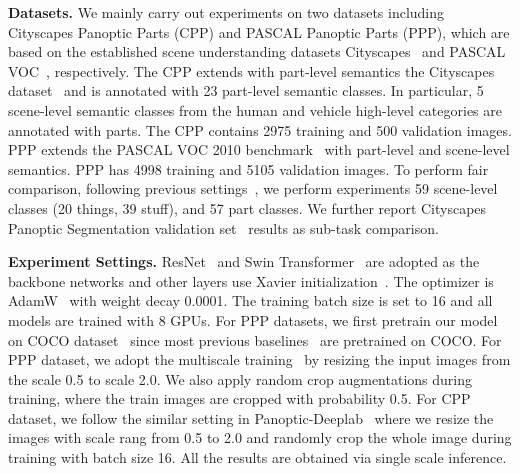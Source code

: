 \noindent
\textbf{Datasets.}
We mainly carry out experiments on two datasets including Cityscapes Panoptic Parts (CPP) and PASCAL Panoptic Parts (PPP), which are based on the established scene understanding datasets Cityscapes~\cite{cordts2016cityscapes} and PASCAL VOC~\cite{Everingham2010Pascal}, respectively. The CPP extends with part-level semantics the Cityscapes dataset~\cite{cordts2016cityscapes} and is annotated with 23 part-level semantic classes. In particular, 5 scene-level semantic classes from the {human} and {vehicle} high-level categories are annotated with parts. The CPP contains 2975 training and 500 validation images. PPP extends the PASCAL VOC 2010 benchmark~\cite{Everingham2010Pascal} with part-level and scene-level semantics. PPP has 4998 training and 5105 validation images. To perform fair comparison, following previous settings~\cite{degeus2021panopticparts,Everingham2010Pascal}, we perform experiments 59 scene-level classes (20 things, 39 stuff), and 57 part classes.  We further report Cityscapes Panoptic Segmentation validation set~\cite{cordts2016cityscapes} results as sub-task comparison.


\noindent
\textbf{Experiment Settings.} ResNet~\cite{resnet} and Swin Transformer~\cite{liu2021swin} are adopted as the backbone networks and other layers use Xavier initialization~\cite{xavier_init}. The optimizer is AdamW~\cite{ADAMW} with weight decay 0.0001. The training batch size is set to 16 and all models are trained with 8 GPUs. For PPP datasets, we first pretrain our model on COCO dataset~\cite{coco_dataset} since most previous baselines~\cite{degeus2021panopticparts} are pretrained on COCO. For PPP dataset, we adopt the multiscale training~\cite{detr} by resizing the input images from the scale 0.5 to scale 2.0. We also apply random crop augmentations during training, where the train images are cropped with probability 0.5. For CPP dataset, we follow the similar setting in Panoptic-Deeplab~\cite{cheng2020panoptic} where we resize the images with scale rang from 0.5 to 2.0 and randomly crop the whole image during training with batch size 16. All the results are obtained via single scale inference. 

